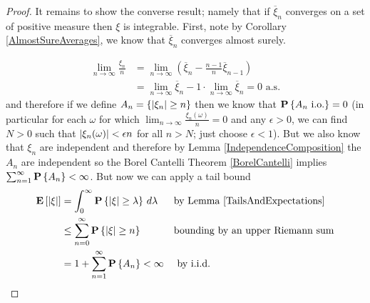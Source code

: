 \begin{proof}
It remains to show the converse result; namely that if
$\overline{\xi}_n$ converges on a set of positive measure then $\xi$
is integrable.  First, note by Corollary \ref{AlmostSureAverages}, we
know that $\overline{\xi}_n$ converges almost surely.

\begin{align*}
\lim_{n \to \infty} \frac{\xi_n}{n} &= \lim_{n \to \infty} \left (
  \overline{\xi}_n - \frac{n-1}{n}   \overline{\xi}_{n-1} \right ) \\
&= \lim_{n \to \infty} \overline{\xi}_n  - 1 \cdot \lim_{n \to \infty}
\overline{\xi}_n = 0 \text{ a.s.}
\end{align*}
and therefore if we define $A_n = \lbrace \left \vert \xi_n \right \vert \geq n \rbrace$
then we know that $\textbf{P}\left \{A_n \text{ i.o.} \right \} = 0$ (in particular
for each $\omega$ for which $\lim_{n \to \infty}
\frac{\xi_n(\omega)}{n} = 0$ and any $\epsilon > 0$, we can find $N > 0$ such that
$\left \vert \xi_n(\omega) \right \vert < \epsilon n$ for all $n > N$; just choose
$\epsilon < 1$).  But we also know that $\xi_n$ are independent and
therefore by Lemma \ref{IndependenceComposition} the $A_n$ are
independent so the Borel Cantelli Theorem \ref{BorelCantelli} implies $\sum_{n=1}^\infty
\textbf{P}\left \{A_n \right \} < \infty$.  But now we can apply a tail bound
\begin{align*}
\textbf{E}\left[\left \vert \xi \right \vert\right] &= \int_0^\infty \textbf{P}\left \{\left \vert \xi \right \vert \geq
  \lambda \right \} \, d\lambda & & \text{by Lemma \ref{TailsAndExpectations}}
\\
&\leq \sum_{n=0}^\infty \textbf{P}\left \{\left \vert \xi \right \vert \geq n \right \} & &
\text{bounding by an upper
  Riemann sum} \\
&= 1 + \sum_{n=1}^\infty \textbf{P}\left \{A_n \right \} < \infty & &\text { by i.i.d.}
\end{align*}
\end{proof}
